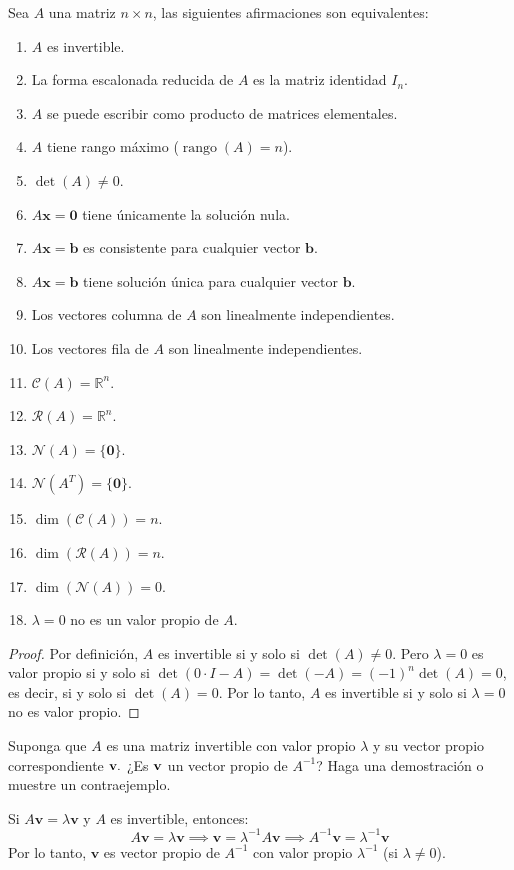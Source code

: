 \begin{theorem}
Sea $A$ una matriz $n\times n$, las siguientes afirmaciones son equivalentes: \begin{enumerate}
    \item $A$ es invertible.
    \item La forma escalonada reducida de $A$ es la matriz identidad $I_n$.
    \item $A$ se puede escribir como producto de matrices elementales.
    \item $A$ tiene rango máximo ($\operatorname{rango}(A) = n$).
    \item $\det(A) \neq 0$.
    \item $A\mathbf{x}=\mathbf{0}$ tiene únicamente la solución nula.
    \item $A\mathbf{x}=\mathbf{b}$ es consistente para cualquier vector $\mathbf{b}$.
    \item $A\mathbf{x}=\mathbf{b}$ tiene solución única para cualquier vector $\mathbf{b}$.
    \item Los vectores columna de $A$ son linealmente independientes.
    \item Los vectores fila de $A$ son linealmente independientes.
    \item $\mathcal{C}(A) = \mathbb{R}^n$.
    \item $\mathcal{R}(A) = \mathbb{R}^n$.
    \item $\mathcal{N}(A) = \{\mathbf{0}\}$.
    \item $\mathcal{N}(A^T) = \{\mathbf{0}\}$.
    \item $\dim(\mathcal{C}(A)) = n$.
    \item $\dim(\mathcal{R}(A)) = n$.
    \item $\dim(\mathcal{N}(A)) = 0$.
    \item $\lambda=0$ no es un valor propio de $A.$
\end{enumerate}
\begin{proof}
Por definición, $A$ es invertible si y solo si $\det(A)\neq 0$. Pero $\lambda=0$ es valor propio si y solo si $\det(0\cdot I - A)=\det(-A)=(-1)^n\det(A)=0$, es decir, si y solo si $\det(A)=0$. Por lo tanto, $A$ es invertible si y solo si $\lambda=0$ no es valor propio. 
\end{proof}
\end{theorem}
\begin{prob} Suponga que $A$ es una matriz invertible con valor propio $\lambda$ y su vector propio correspondiente ${\bf{v}}.$ ¿Es  ${\bf{v}}$ un vector propio de $A^{-1}$? Haga una demostración o muestre un contraejemplo.
\begin{myproof}
Si $A\mathbf{v} = \lambda \mathbf{v}$ y $A$ es invertible, entonces:
\[
A\mathbf{v} = \lambda \mathbf{v} \implies \mathbf{v} = \lambda^{-1} A \mathbf{v} \implies A^{-1} \mathbf{v} = \lambda^{-1} \mathbf{v}
\]
Por lo tanto, $\mathbf{v}$ es vector propio de $A^{-1}$ con valor propio $\lambda^{-1}$ (si $\lambda \neq 0$).
\end{myproof}
\end{prob}
